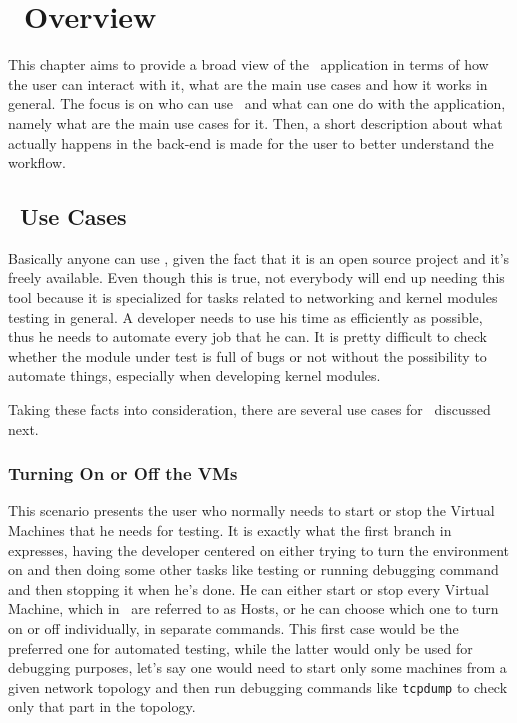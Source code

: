 \chapter{\project\ Overview}
\label{chapter:Chapter 3}

This chapter aims to provide a broad view of the \project\ application in terms of how the user can interact with it, what are the main use cases and how it works in general.
The focus is on who can use \project\ and what can one do with the application, namely what are the main use cases for it.
Then, a short description about what actually happens in the back-end is made for the user to better understand the workflow.

\section{\project\ Use Cases}
\label{sec:who-uses-vlab}

Basically anyone can use \project, given the fact that it is an open source project and it's freely available.
Even though this is true, not everybody will end up needing this tool because it is specialized for tasks related to networking and kernel modules testing in general.
A developer needs to use his time as efficiently as possible, thus he needs to automate every job that he can.
It is pretty difficult to check whether the module under test is full of bugs or not without the possibility to automate things, especially when developing kernel modules.

Taking these facts into consideration, there are several use cases for \project\ discussed next.

\subsection{Turning On or Off the VMs}
\label{sub-sec:turning-on-off-vms}


This scenario presents the user who normally needs to start or stop the Virtual Machines that he needs for testing.
It is exactly what the first branch in  expresses, having the developer centered on either trying to turn the environment on and then doing some other tasks like testing or running debugging command and then stopping it when he's done.
He can either start or stop every Virtual Machine, which in \project\ are referred to as Hosts, or he can choose which one to turn on or off individually, in separate commands.
This first case would be the preferred one for automated testing, while the latter would only be used for debugging purposes, let's say one would need to start only some machines from a given network topology and then run debugging commands like \texttt{tcpdump} to check only that part in the topology.

